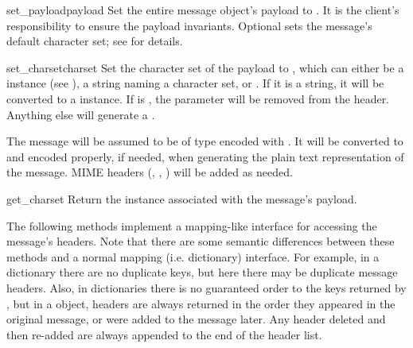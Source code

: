 \begin{methoddesc}[Message]{set_payload}{payload}
Set the entire message object's payload to .  It is the
client's responsibility to ensure the payload invariants.  Optional
 sets the message's default character set; see
 for details.

\end{methoddesc}

\begin{methoddesc}[Message]{set_charset}{charset}
Set the character set of the payload to , which can
either be a  instance (see ), a
string naming a character set,
or .  If it is a string, it will be converted to a
 instance.  If  is , the
 parameter will be removed from the
 header. Anything else will generate a
.

The message will be assumed to be of type  encoded with
.  It will be converted to
and encoded properly, if needed, when generating the plain text
representation of the message.  MIME headers
(, ,
) will be added as needed.

\end{methoddesc}

\begin{methoddesc}[Message]{get_charset}{}
Return the  instance associated with the message's payload.
\end{methoddesc}

The following methods implement a mapping-like interface for accessing
the message's  headers.  Note that there are some
semantic differences between these methods and a normal mapping
(i.e. dictionary) interface.  For example, in a dictionary there are
no duplicate keys, but here there may be duplicate message headers.  Also,
in dictionaries there is no guaranteed order to the keys returned by
, but in a  object, headers are always
returned in the order they appeared in the original message, or were
added to the message later.  Any header deleted and then re-added are
always appended to the end of the header list.

